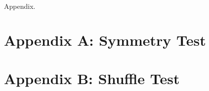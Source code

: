 Appendix.

\section{Appendix A: Symmetry Test}



















\section{Appendix B: Shuffle Test}

















